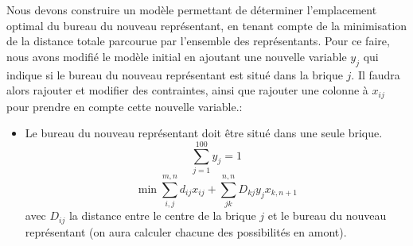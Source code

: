 Nous devons construire un modèle permettant de déterminer l'emplacement optimal du bureau du nouveau représentant, en tenant compte de la minimisation de la distance totale parcourue par l'ensemble des représentants.
Pour ce faire, nous avons modifié le modèle initial en ajoutant une nouvelle variable $y_{j}$ qui indique si le bureau du nouveau représentant est situé dans la brique $j$.
Il faudra alors rajouter et modifier des contraintes, ainsi que rajouter une colonne à $x_{ij}$ pour prendre en compte cette nouvelle variable.: 
\begin{itemize}
    \item Le bureau du nouveau représentant doit être situé dans une seule brique.
    \begin{equation}
        \sum_{j=1}^{100} y_j = 1
    \end{equation}
    \begin{equation}
        \min \sum_{i,j}^{m, n} d_{ij} x_{ij} + \sum_{jk}^{n, n} D_{kj} y_{j} x_{k, n + 1} 
    \end{equation}
    avec $D_{ij}$ la distance entre le centre de la brique $j$ et le bureau du nouveau représentant (on aura calculer chacune des possibilités en amont).


\end{itemize}
